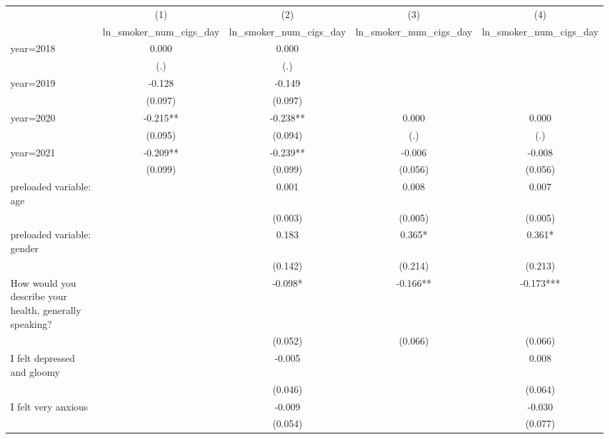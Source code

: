 {
\def\sym#1{\ifmmode^{#1}\else\(^{#1}\)\fi}
\begin{tabular}{l*{4}{c}}
\hline\hline
                &\multicolumn{1}{c}{(1)}&\multicolumn{1}{c}{(2)}&\multicolumn{1}{c}{(3)}&\multicolumn{1}{c}{(4)}\\
                &\multicolumn{1}{c}{ln\_smoker\_num\_cigs\_day}&\multicolumn{1}{c}{ln\_smoker\_num\_cigs\_day}&\multicolumn{1}{c}{ln\_smoker\_num\_cigs\_day}&\multicolumn{1}{c}{ln\_smoker\_num\_cigs\_day}\\
\hline
year=2018       &    0.000   &    0.000   &            &            \\
                &      (.)   &      (.)   &            &            \\
[1em]
year=2019       &   -0.128   &   -0.149   &            &            \\
                &  (0.097)   &  (0.097)   &            &            \\
[1em]
year=2020       &   -0.215** &   -0.238** &    0.000   &    0.000   \\
                &  (0.095)   &  (0.094)   &      (.)   &      (.)   \\
[1em]
year=2021       &   -0.209** &   -0.239** &   -0.006   &   -0.008   \\
                &  (0.099)   &  (0.099)   &  (0.056)   &  (0.056)   \\
[1em]
preloaded variable: age&            &    0.001   &    0.008   &    0.007   \\
                &            &  (0.003)   &  (0.005)   &  (0.005)   \\
[1em]
preloaded variable: gender&            &    0.183   &    0.365*  &    0.361*  \\
                &            &  (0.142)   &  (0.214)   &  (0.213)   \\
[1em]
How would you describe your health, generally speaking?&            &   -0.098*  &   -0.166** &   -0.173***\\
                &            &  (0.052)   &  (0.066)   &  (0.066)   \\
[1em]
I felt depressed and gloomy&            &   -0.005   &            &    0.008   \\
                &            &  (0.046)   &            &  (0.064)   \\
[1em]
I felt very anxious&            &   -0.009   &            &   -0.030   \\
                &            &  (0.054)   &            &  (0.077)   \\

\end{tabular}}
